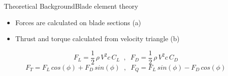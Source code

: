 
\begin{frame}{Theoretical Background}{Blade element theory}
	\begin{itemize}
		\item Forces are calculated on blade sections (a)
		\item Thrust and torque calculated from velocity triangle (b)
	\end{itemize}

	\begin{equation}
		F_L = \dfrac{1}{2}\,  \rho \, V^2 c \, C_L \;\; , \;\; F_D = \dfrac{1}{2} \, \rho \, V^2 c \, C_D
	\end{equation}
	\begin{equation}
		F_T = F_L \, cos(\phi) + F_D \, sin(\phi) \;\; , \;\;F_Q = F_L \, sin(\phi) - F_D \, cos(\phi)
	\end{equation}
	\begin{figure}[ht]
		\centering
		\hfil
		\label{fig:blade_triangles}
	\end{figure}
\end{frame}


